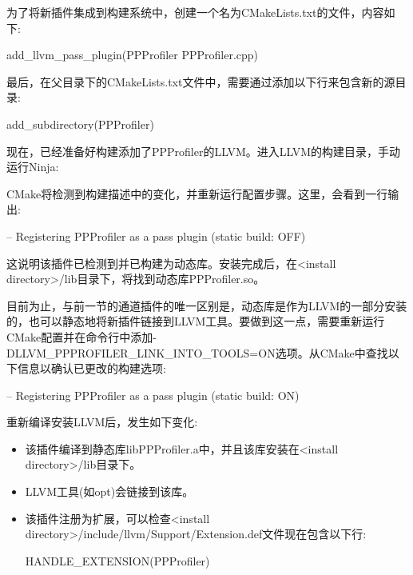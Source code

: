 为了将新插件集成到构建系统中，创建一个名为CMakeLists.txt的文件，内容如下:

\begin{cmake}
add_llvm_pass_plugin(PPProfiler PPProfiler.cpp)
\end{cmake}

最后，在父目录下的CMakeLists.txt文件中，需要通过添加以下行来包含新的源目录:

\begin{cmake}
add_subdirectory(PPProfiler)
\end{cmake}

现在，已经准备好构建添加了PPProfiler的LLVM。进入LLVM的构建目录，手动运行Ninja:


CMake将检测到构建描述中的变化，并重新运行配置步骤。这里，会看到一行输出:

\begin{shell}
-- Registering PPProfiler as a pass plugin (static build: OFF)
\end{shell}

这说明该插件已检测到并已构建为动态库。安装完成后，在<install directory>/lib目录下，将找到动态库PPProfiler.so。

目前为止，与前一节的通道插件的唯一区别是，动态库是作为LLVM的一部分安装的，也可以静态地将新插件链接到LLVM工具。要做到这一点，需要重新运行CMake配置并在命令行中添加-DLLVM\_PPPROFILER\_LINK\_INTO\_TOOLS=ON选项。从CMake中查找以下信息以确认已更改的构建选项:

\begin{shell}
-- Registering PPProfiler as a pass plugin (static build: ON)
\end{shell}

重新编译安装LLVM后，发生如下变化:

\begin{itemize}
\item
该插件编译到静态库libPPProfiler.a中，并且该库安装在<install directory>/lib目录下。

\item
LLVM工具(如opt)会链接到该库。

\item
该插件注册为扩展，可以检查<install directory>/include/llvm/Support/Extension.def文件现在包含以下行:

\begin{shell}
HANDLE_EXTENSION(PPProfiler)
\end{shell}
\end{itemize}

